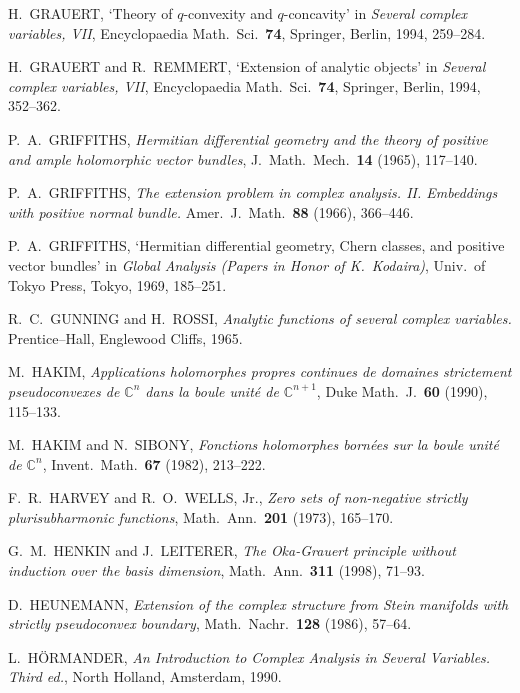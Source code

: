 \documentclass[11pt]{amsart}
\numberwithin{equation}{section}
\theoremstyle{definition}
\begin{document}
\begin{thebibliography}{10}
H.\ GRAUERT, 
`Theory of $q$-convexity and $q$-concavity' in 
\textit{Several complex variables, VII}, 
Encyclopaedia Math.\ Sci.\ \textbf{74}, 
Springer, Berlin, 1994, 259--284.

H.\ GRAUERT and R.\ REMMERT, 
`Extension of analytic objects' in 
\textit{Several complex variables, VII},  
Encyclopaedia Math.\ Sci.\ \textbf{74}, 
Springer, Berlin, 1994, 352--362.

P.\ A.\ GRIFFITHS,
\textit{Hermitian differential geometry and 
the theory of positive and ample holomorphic vector bundles}, 
J.\ Math.\ Mech.\ \textbf{14} (1965), 117--140. 

P.\ A.\ GRIFFITHS,
\textit{The extension problem in complex analysis. II. 
Embeddings with positive normal bundle.}
Amer.\ J.\ Math.\  \textbf{88}  (1966), 366--446.

P.\ A.\ GRIFFITHS,
`Hermitian differential geometry, Chern classes, and positive vector bundles' in   
\textit{Global Analysis (Papers in Honor of K.\ Kodaira)}, 
Univ.\ of Tokyo Press, Tokyo, 1969, 185--251.

R.\ C.\ GUNNING and H.\ ROSSI, 
\textit{Analytic functions of several complex variables.}
Prentice--Hall, Englewood Cliffs, 1965.

M.\ HAKIM,
\textit{Applications holomorphes propres continues de domaines strictement pseudoconvexes 
de ${\mathbb{C}}^n$ dans la boule unit\'e de ${\mathbb{C}}^{n+1}$}, 
Duke Math.\ J.\ \textbf{60} (1990), 115--133. 

M.\ HAKIM and N.\ SIBONY,
\textit{Fonctions holomorphes born\'ees sur la boule unit\'e de ${\mathbb{C}}^n$},
Invent.\ Math.\ \textbf{67} (1982), 213--222. 

F.\ R.\ HARVEY and R.\ O.\ WELLS, Jr.,
\textit{Zero sets of non-negative strictly plurisubharmonic functions}, 
Math.\ Ann.\ \textbf{201} (1973), 165--170.

G.\ M.\ HENKIN and J.\ LEITERER, 
\textit{The Oka-Grauert principle without induction over the basis dimension},
Math.\ Ann.\ \textbf{311} (1998), 71--93.

D.\ HEUNEMANN, 
\textit{Extension of the complex structure from Stein manifolds
with strictly pseudoconvex boundary},
Math.\ Nachr.\ \textbf{128} (1986), 57--64.

L.\ H\"ORMANDER, 
\textit{An Introduction to Complex Analysis in Several Variables. Third ed.}, 
North Holland, Amsterdam, 1990.


\end{thebibliography}
\end{document}
